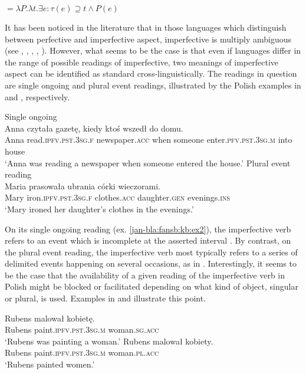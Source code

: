 \documentclass[output=paper]{langscibook}
\begin{document}
\ea {} $= \lambda P. \lambda t. \exists e : \tau(e) \supseteq t \wedge P(e)$\label{jan-bla:fansb:kb:ex1}
\z

\noindent It has been noticed in the literature that in those languages which distinguish between perfective and imperfective aspect, imperfective is multiply ambiguous (see \citealt {ArreguiRiveroandSalanova2014}, \citealt{CipriaandRoberts2000}, \citealt{Deo2009,Deo2015}, \citealt{Hacquard2006}, \citealt{deSwart1998}). However, what seems to be the case is that even if languages differ in the range of possible readings of imperfective, two meanings of imperfective aspect can be identified as standard cross-linguistically. The readings in question are single ongoing and plural event readings, illustrated by the Polish examples in  and , respectively.

\ea Single ongoing\label{jan-bla:fansb:kb:ex2}\\
\gll Anna czytała gazetę, kiedy ktoś wszedł do domu.\\  
     Anna read.\textsc{ipfv}.\textsc{pst}.\textsc{3sg}.\textsc{f} newspaper.\textsc{acc} when someone enter.\textsc{pfv}.\textsc{pst}.\textsc{3sg}.\textsc{m} into house\\
\glt ‘Anna was reading a newspaper when someone entered the house.’
\ex Plural event reading\label{jan-bla:fansb:kb:ex3}\\
Maria prasowała ubrania córki wieczorami.\\  
Mary iron.\textsc{ipfv}.\textsc{pst}.\textsc{3sg}.\textsc{f} clothes.\textsc{acc} daughter.\textsc{gen} evenings.\textsc{ins}\\
\glt ‘Mary ironed her daughter’s clothes in the evenings.’
\z

\noindent On its single ongoing reading (ex. \ref{jan-bla:fansb:kb:ex2}), the imperfective verb refers to an event which is incomplete at the asserted interval \citet[200--201]{Willim2006}. By contrast, on the plural event reading, the imperfective verb most typically refers to a series of delimited events happening on several occasions, as in . Interestingly, it seems to be the case that the availability of a given reading of the imperfective verb in Polish might be blocked or facilitated depending on what kind of object, singular or plural, is used. Examples in  and  illustrate this point.

\ea
\gll Rubens malował kobietę.\label{jan-bla:fansb:kb:ex4}\\  
     Rubens paint.\textsc{ipfv}.\textsc{pst}.\textsc{3sg}.\textsc{m} woman.\textsc{sg}.\textsc{acc}\\
\glt ‘Rubens was painting a woman.’
\ex
\gll Rubens malował kobiety.\label{jan-bla:fansb:kb:ex5}\\  
     Rubens paint.\textsc{ipfv}.\textsc{pst}.\textsc{3sg}.\textsc{m} woman.\textsc{pl}.\textsc{acc}\\
\glt ‘Rubens painted women.’
\z
\end{document}
